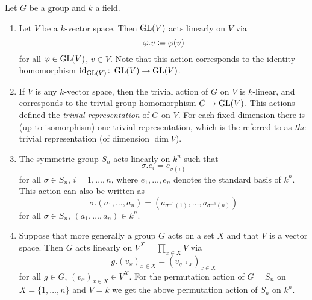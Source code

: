 \begin{example}
  \label{example: representations of groups}
  Let $G$ be a group and $k$ a field.
  \begin{enumerate}
    \item
      Let $V$ be a $k$-vector space.
      Then $\operatorname{GL}(V)$ acts linearly on $V$ via
      \[
                  \varphi.v
        \coloneqq  \varphi(v)
      \]
      for all $\varphi \in \operatorname{GL}(V)$, $v \in V$.
      Note that this action corresponds to the identity homomorphism $\operatorname{id}_{\operatorname{GL}(V)} \colon \operatorname{GL}(V) \to \operatorname{GL}(V)$.
    \item
      If $V$ is any $k$-vector space, then the trivial action of $G$ on $V$ is $k$-linear, and corresponds to the trivial group homomorphism $G \to \operatorname{GL}(V)$.
      This actions defined the \emph{trivial representation} of $G$ on $V$.
      For each fixed dimension there is (up to isomorphism) one trivial representation, which is the referred to as \emph{the} trivial representation (of dimension $\dim V$).
    \item
      The symmetric group $S_n$ acts linearly on $k^n$ such that
      \[
        \sigma.e_i = e_{\sigma(i)}
      \]
      for all $\sigma \in S_n$, $i = 1, \dotsc, n$, where $e_1, \dotsc, e_n$ denotes the standard basis of $k^n$.
      This action can also be written as
      \[
          \sigma.(a_1, \dotsc, a_n)
        = ( a_{\sigma^{-1}(1)}, \dotsc, a_{\sigma^{-1}(n)} )
      \]
      for all $\sigma \in S_n$, $(a_1, \dotsc, a_n) \in k^n$.
    \item
      Suppose that more generally a group $G$ acts on a set $X$ and that $V$ is a vector space.
      Then $G$ acts linearly on $V^X = \prod_{x \in X} V$ via
      \[
          g.(v_x)_{x \in X}
        = (v_{g^{-1}.x})_{x \in X}
      \]
      for all $g \in G$, $(v_x)_{x \in X} \in V^X$.
      For the permutation action of $G = S_n$ on $X = \{1, \dotsc, n\}$ and $V = k$ we get the above permutation action of $S_n$ on $k^n$.
      

\end{enumerate}
\end{example}
